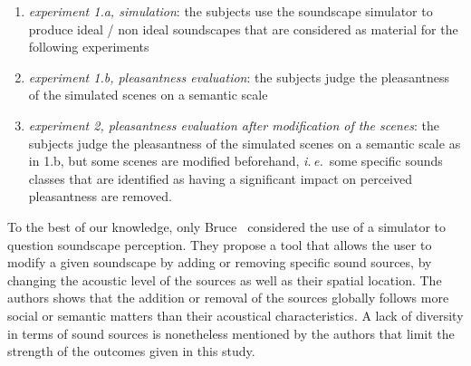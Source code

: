 \documentclass[12pt]{elsarticle}
\newcommand{\ie}{\emph{i.\,e.}}
\newcommand{\al}{\emph{et~al.}}
\begin{document}
\begin{enumerate}
\item \emph{experiment 1.a, simulation}:  the subjects use the soundscape simulator to produce ideal / non ideal soundscapes that are considered as material for the following experiments
\item \emph{experiment 1.b, pleasantness evaluation}: the subjects judge the pleasantness of the simulated scenes on a semantic scale
\item \emph{experiment 2, pleasantness evaluation after modification of the scenes}: the subjects judge the pleasantness of the simulated scenes on a semantic scale as in 1.b, but some scenes are modified beforehand, \ie~some specific sounds classes that are identified as having a significant impact on perceived pleasantness are removed.
\end{enumerate}


To the best of our knowledge, only Bruce~\cite{bruce2009development,bruce2014effects} considered the use of a simulator to question soundscape perception. They propose a tool that allows the user to modify a given soundscape by adding or removing specific sound sources, by changing the acoustic level of the sources as well as their spatial location. The authors shows that the addition or removal of the sources globally follows more social or semantic matters than their acoustical characteristics. A lack of diversity in terms of sound sources is nonetheless mentioned by the authors that limit the strength of the outcomes given in this study.

\end{document}
